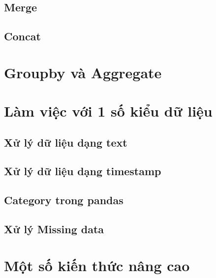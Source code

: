 \documentclass[
]{book}
\begin{document}
\hypertarget{merge}{%
\section{Merge}\label{merge}}

\hypertarget{concat}{%
\section{Concat}\label{concat}}

\hypertarget{groupby-vuxe0-aggregate}{%
\chapter{Groupby và Aggregate}\label{groupby-vuxe0-aggregate}}

\hypertarget{luxe0m-viux1ec7c-vux1edbi-1-sux1ed1-kiux1ec3u-dux1eef-liux1ec7u}{%
\chapter{Làm việc với 1 số kiểu dữ liệu}\label{luxe0m-viux1ec7c-vux1edbi-1-sux1ed1-kiux1ec3u-dux1eef-liux1ec7u}}

\hypertarget{xux1eed-luxfd-dux1eef-liux1ec7u-dux1ea1ng-text}{%
\section{Xử lý dữ liệu dạng text}\label{xux1eed-luxfd-dux1eef-liux1ec7u-dux1ea1ng-text}}

\hypertarget{xux1eed-luxfd-dux1eef-liux1ec7u-dux1ea1ng-timestamp}{%
\section{Xử lý dữ liệu dạng timestamp}\label{xux1eed-luxfd-dux1eef-liux1ec7u-dux1ea1ng-timestamp}}

\hypertarget{category-trong-pandas}{%
\section{Category trong pandas}\label{category-trong-pandas}}

\hypertarget{xux1eed-luxfd-missing-data}{%
\section{Xử lý Missing data}\label{xux1eed-luxfd-missing-data}}

\hypertarget{mux1ed9t-sux1ed1-kiux1ebfn-thux1ee9c-nuxe2ng-cao}{%
\chapter{Một số kiến thức nâng cao}\label{mux1ed9t-sux1ed1-kiux1ebfn-thux1ee9c-nuxe2ng-cao}}
\end{document}
